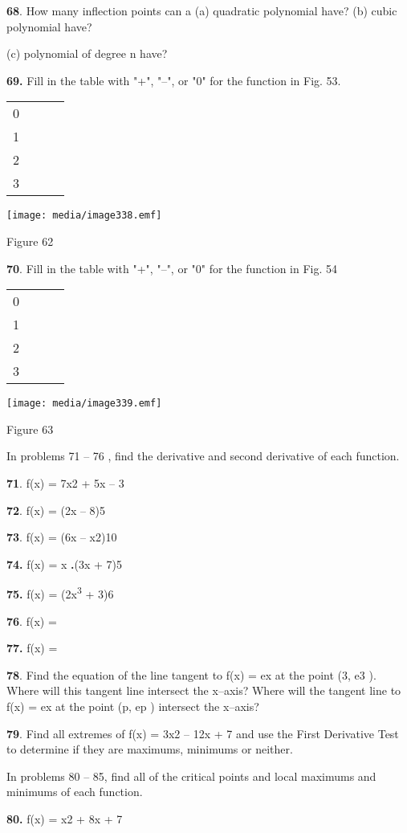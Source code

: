 \textbf{68}. How many inflection points can a (a) quadratic polynomial
have? (b) cubic polynomial have?

(c) polynomial of degree n have?

\textbf{69.} Fill in the table with "+", "--", or "0" for the function
in Fig. 53.

\begin{longtable}[]{@{}llll@{}}
\toprule
0 & & &\tabularnewline
1 & & &\tabularnewline
2 & & &\tabularnewline
3 & & &\tabularnewline
\bottomrule
\end{longtable}

\texttt{[image: media/image338.emf]}

Figure 62

\textbf{70}. Fill in the table with "+", "--", or "0" for the function
in Fig. 54

\begin{longtable}[]{@{}llll@{}}
\toprule
0 & & &\tabularnewline
1 & & &\tabularnewline
2 & & &\tabularnewline
3 & & &\tabularnewline
\bottomrule
\end{longtable}

\texttt{[image: media/image339.emf]}

Figure 63

In problems 71 -- 76 , find the derivative and second derivative of each
function.

\textbf{71}. f(x) = 7x2 + 5x -- 3

\textbf{72}. f(x) = (2x -- 8)5

\textbf{73}. f(x) = (6x -- x2)10

\textbf{74.} f(x) = x \textbf{.}(3x + 7)5

\textbf{75.} f(x) = (2x\textsuperscript{3} + 3)6

\textbf{76}. f(x) =

\textbf{77.} f(x) =

\textbf{78}. Find the equation of the line tangent to f(x) = ex at the
point (3, e3 ). Where will this tangent line intersect the x--axis?
Where will the tangent line to f(x) = ex at the point (p, ep ) intersect
the x--axis?

\textbf{79}. Find all extremes of f(x) = 3x2 -- 12x + 7 and use the
First Derivative Test to determine if they are maximums, minimums or
neither.

In problems 80 -- 85, find all of the critical points and local maximums
and minimums of each function.

\textbf{80.} f(x) = x2 + 8x + 7

